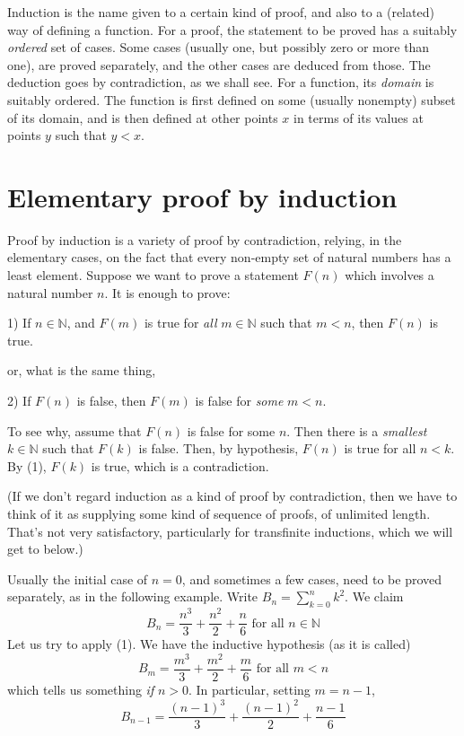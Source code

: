 \documentclass{article}
\begin{document}
Induction is the name given to a certain kind of proof, and also to
a (related) way of defining a function.
For a proof, the statement to
be proved has a suitably \emph{ordered} set of cases.
Some cases (usually one, but possibly zero or more than one), are proved
separately, and the other cases are deduced from those.
The deduction goes by contradiction, as we shall see.
For a function, its \emph{domain} is suitably ordered.
The function is first defined on some (usually nonempty)
subset of its domain, and is then defined at other points
$x$ in terms of its values at points $y$ such that $y<x$.

\section{Elementary proof by induction}
Proof by induction is a variety of proof by contradiction, relying,
in the elementary cases, on the fact that every non-empty set of
natural numbers has a least element.
Suppose we want to prove a statement $F(n)$ which involves a natural
number $n$.
It is enough to prove:

1) If $n\in\mathbb{N}$, and $F(m)$ is true for \emph{all}
$m\in\mathbb{N}$ such that $m<n$, then $F(n)$ is true.

or, what is the same thing,

2) If $F(n)$ is false, then $F(m)$ is false for \emph{some} $m<n$.

To see why, assume that $F(n)$ is false for some $n$.
Then there is a \emph{smallest} $k \in {\mathbb N}$
such that $F(k)$ is false.
Then, by hypothesis, $F(n)$ is true for all $n<k$.
By (1), $F(k)$ is true, which is a contradiction.

(If we don't regard induction as a kind of proof by contradiction, then we
have to think of it as supplying some kind of sequence of proofs, of
unlimited length.
That's not very satisfactory, particularly for transfinite
inductions, which we will get to below.)

Usually the initial case of $n=0$, and sometimes a few cases, need
to be proved separately, as in the following example.
Write $B_n=\sum_{k=0}^n k^2$.
We claim
$$B_n=\frac{n^3}{3} + \frac{n^2}{2}
  + \frac{n}{6} \textrm{ for all }n\in \mathbb{N}$$
Let us try to apply (1). We have the inductive hypothesis (as it is called)
$$B_m=
\frac{m^3}{3} + \frac{m^2}{2} + \frac{m}{6} \textrm{ for all }m<n$$
which tells us something \emph{if} $n>0$. In particular, setting $m=n-1$,
$$B_{n-1}=\frac{(n-1)^3}{3} + \frac{(n-1)^2}{2} + \frac{n-1}{6}$$
\end{document}
